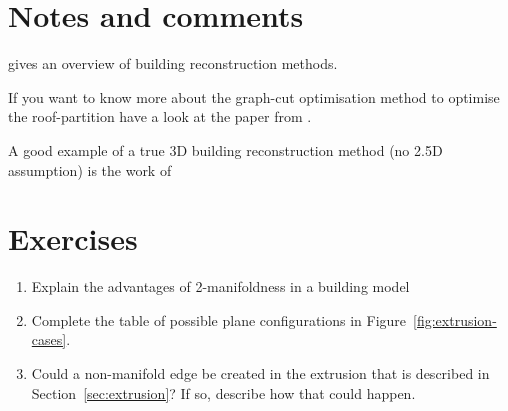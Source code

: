 %
\section{Notes and comments}
\citet{Rottensteiner14} gives an overview of building reconstruction methods.

If you want to know more about the graph-cut optimisation method to optimise the roof-partition have a look at the paper from \citet{Zebedin08}.

A good example of a true 3D building reconstruction method (no 2.5D assumption) is the work of \citet{Nan2017}

%
\section{Exercises}

\begin{enumerate}
  \item Explain the advantages of 2-manifoldness in a building model
  \item Complete the table of possible plane configurations in Figure~\ref{fig:extrusion-cases}.
  \item Could a non-manifold edge be created in the extrusion that is described in Section~\ref{sec:extrusion}? If so, describe how that could happen.
\end{enumerate}
